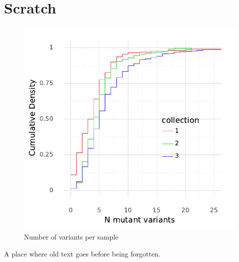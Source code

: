 \section{Scratch}

\begin{figure}[H]
    \centering
    \includegraphics{figures/nvar_plot.pdf}
    \caption{Number of variants per sample}
    \label{fig:sample_nvar_counts}
\end{figure}


A place where old text goes before being forgotten.

